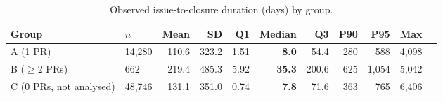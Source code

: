 \begin{table}[t]
\centering
\caption{Observed issue-to-closure duration (days) by group.\label{tab:descriptives}}
\small \begin{tabular}{@{}llrrrrrrrrr@{}}
\toprule
Group & $n$ & Mean & SD & Q1 & Median & Q3 & P90 & P95 & Max \\\midrule
A (1 PR) & 14,280 & 110.6 & 323.2 & 1.51 & \textbf{8.0} & 54.4 & 280 & 588 & 4,098\\
B ($\geq$2 PRs) & 662 & 219.4 & 485.3 & 5.92 & \textbf{35.3} & 200.6 & 625 & 1,054 & 5,042\\
C (0 PRs, not analysed) & 48,746 & 131.1 & 351.0 & 0.74 & \textbf{7.8} & 71.6 & 363 & 765 & 6,406\\
\bottomrule
\end{tabular}
\end{table}
